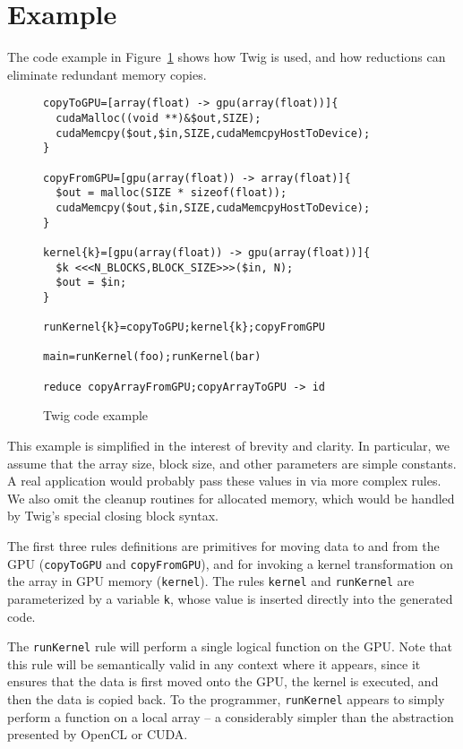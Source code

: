 
\section{Example}
\label{sec:example}

The code example in Figure~\ref{fig:example-code} shows how Twig is used, and how reductions can eliminate redundant memory copies.

\begin{figure}[ht]
\begin{verbatim}
copyToGPU=[array(float) -> gpu(array(float))]{
  cudaMalloc((void **)&$out,SIZE);
  cudaMemcpy($out,$in,SIZE,cudaMemcpyHostToDevice);
}

copyFromGPU=[gpu(array(float)) -> array(float)]{
  $out = malloc(SIZE * sizeof(float));
  cudaMemcpy($out,$in,SIZE,cudaMemcpyHostToDevice);
}

kernel{k}=[gpu(array(float)) -> gpu(array(float))]{
  $k <<<N_BLOCKS,BLOCK_SIZE>>>($in, N);
  $out = $in;
}

runKernel{k}=copyToGPU;kernel{k};copyFromGPU

main=runKernel(foo);runKernel(bar)

reduce copyArrayFromGPU;copyArrayToGPU -> id
\end{verbatim}
\caption{Twig code example}
\label{fig:example-code}
\end{figure}

This example is simplified in the interest of brevity and clarity. In particular, we assume that the array size, block size, and other parameters are simple constants. A real application would probably pass these values in via more complex rules. We also omit the cleanup routines for allocated memory, which would be handled by Twig's special closing block syntax.

The first three rules definitions are primitives for moving data to and from the GPU (\texttt{copyToGPU} and \texttt{copyFromGPU}), and for invoking a kernel transformation on the array in GPU memory (\texttt{kernel}). The rules \texttt{kernel} and \texttt{runKernel} are parameterized by a variable \texttt{k}, whose value is inserted directly into the generated code.

The \texttt{runKernel} rule will perform a single logical function on the GPU. Note that this rule will be semantically valid in any context where it appears, since it ensures that the data is first moved onto the GPU, the kernel is executed, and then the data is copied back. To the programmer, \texttt{runKernel} appears to simply perform a function on a local array -- a considerably simpler than the abstraction presented by OpenCL or CUDA.

